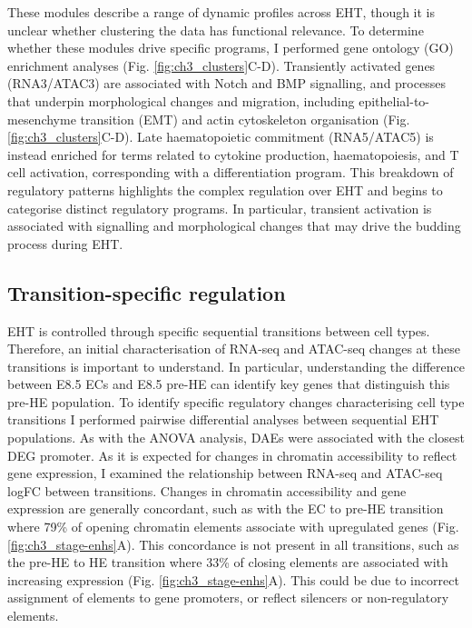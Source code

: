 These modules describe a range of dynamic profiles across EHT, though it is unclear whether clustering the data has functional relevance. To determine whether these modules drive specific programs, I performed gene ontology (GO) enrichment analyses (Fig. \ref{fig:ch3_clusters}C-D). Transiently activated genes (RNA3/ATAC3) are associated with Notch and BMP signalling, and processes that underpin morphological changes and migration, including epithelial-to-mesenchyme transition (EMT) and actin cytoskeleton organisation (Fig. \ref{fig:ch3_clusters}C-D). Late haematopoietic commitment (RNA5/ATAC5) is instead enriched for terms related to cytokine production, haematopoiesis, and T cell activation, corresponding with a differentiation program. This breakdown of regulatory patterns highlights the complex regulation over EHT and begins to categorise distinct regulatory programs. In particular, transient activation is associated with signalling and morphological changes that may drive the budding process during EHT.

\subsection{\label{ch3:cd109}Transition-specific regulation}

EHT is controlled through specific sequential transitions between cell types. Therefore, an initial characterisation of RNA-seq and ATAC-seq changes at these transitions is important to understand. In particular, understanding the difference between E8.5 ECs and E8.5 pre-HE can identify key genes that distinguish this pre-HE population. To identify specific regulatory changes characterising cell type transitions I performed pairwise differential analyses between sequential EHT populations. As with the ANOVA analysis, DAEs were associated with the closest DEG promoter. As it is expected for changes in chromatin accessibility to reflect gene expression, I examined the relationship between RNA-seq and ATAC-seq logFC between transitions. Changes in chromatin accessibility and gene expression are generally concordant, such as with the EC to pre-HE transition where 79\% of opening chromatin elements associate with upregulated genes (Fig. \ref{fig:ch3_stage-enhs}A). This concordance is not present in all transitions, such as the pre-HE to HE transition where 33\% of closing elements are associated with increasing expression (Fig. \ref{fig:ch3_stage-enhs}A). This could be due to incorrect assignment of elements to gene promoters, or reflect silencers or non-regulatory elements.

